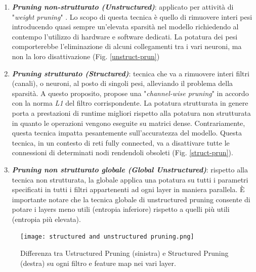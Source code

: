 \begin{enumerate}
    \item {\bfseries{\emph{Pruning non-strutturato (Unstructured)}}}: applicato per attività 
    di "\emph{weight pruning}"\cite{NIPS1989_6c9882bb} \cite{NIPS1992_303ed4c6}. Lo scopo di questa tecnica è quello di 
    rimuovere interi pesi introducendo quasi sempre un'elevata sparsità 
    nel modello richiedendo al contempo l'utilizzo di hardware e software 
    dedicati. La potatura dei pesi comporterebbe l'eliminazione di alcuni 
    collegamenti tra i vari neuroni, ma non la loro disattivazione (Fig. 
    \ref{unstruct-prun})
    \item {\bfseries{\emph{Pruning strutturato (Structured)}}}: tecnica che va a rimuovere interi 
    filtri (canali), o neuroni, al posto di singoli pesi, alleviando il problema 
    della sparsità. A questo proposito, \cite{li2017pruning} propose una "\emph{channel-wise 
    pruning}" in accordo con la norma \emph{L1} del filtro corrispondente. La 
    potatura strutturata in genere porta a prestazioni di runtime migliori 
    rispetto alla potatura non strutturata in quanto le operazioni vengono 
    eseguite su matrici dense. Contrariamente, questa tecnica impatta 
    pesantemente sull'accuratezza del modello. Questa tecnica, in un 
    contesto di reti fully connected, va a disattivare tutte le connessioni 
    di determinati nodi rendendoli obsoleti (Fig. \ref{struct-prun}).
    \item {\bfseries{\emph{Pruning non strutturato globale (Global Unstructured)}}}: rispetto 
    alla tecnica non strutturata, la globale applica una potatura su 
    tutti i parametri specificati in tutti i filtri appartenenti ad ogni layer 
    in maniera parallela. È importante notare che la tecnica globale di 
    unstructured pruning consente di potare i layers meno utili (entropia 
    inferiore) rispetto a quelli più utili (entropia più elevata).
\end{enumerate}

\begin{figure}
    \centering
    \texttt{[image: structured and unstructured pruning.png]}
    \centering
    \caption{Differenza tra Ustructured Pruning (sinistra) e Structured Pruning (destra) su ogni filtro e feature map nei vari layer.}
    \label{filter-pruning}
\end{figure}

